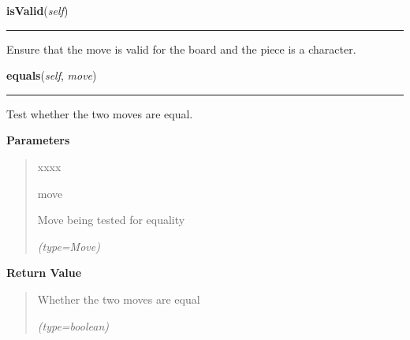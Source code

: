     \label{UnBlockMe:Map:Move:Move:isValid}

    \vspace{0.5ex}

\hspace{.8\funcindent}\begin{boxedminipage}{\funcwidth}

    \raggedright \textbf{isValid}(\textit{self})

    \vspace{-1.5ex}

    \rule{\textwidth}{0.5\fboxrule}
\setlength{\parskip}{2ex}
    Ensure that the move is valid for the board and the piece is a 
    character.

\setlength{\parskip}{1ex}
    \end{boxedminipage}

    \label{UnBlockMe:Map:Move:Move:equals}

    \vspace{0.5ex}

\hspace{.8\funcindent}\begin{boxedminipage}{\funcwidth}

    \raggedright \textbf{equals}(\textit{self}, \textit{move})

    \vspace{-1.5ex}

    \rule{\textwidth}{0.5\fboxrule}
\setlength{\parskip}{2ex}
    Test whether the two moves are equal.

\setlength{\parskip}{1ex}
      \textbf{Parameters}
      \vspace{-1ex}

      \begin{quote}
        \begin{Ventry}{xxxx}

          \item[move]

          Move being tested for equality

            {\it (type=Move)}

        \end{Ventry}

      \end{quote}

      \textbf{Return Value}
    \vspace{-1ex}

      \begin{quote}
      Whether the two moves are equal

      {\it (type=boolean)}

      \end{quote}

    \end{boxedminipage}

